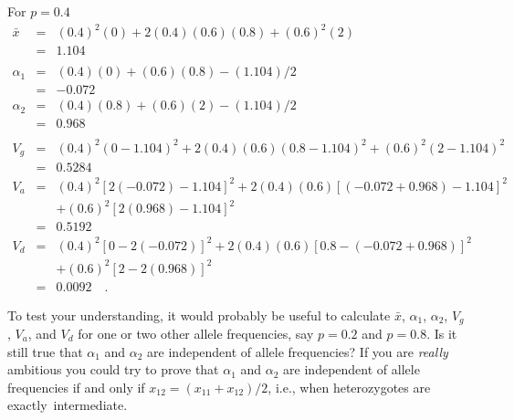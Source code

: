 For $p = 0.4$
\begin{eqnarray*}
{\bar x} &=& (0.4)^2(0) + 2(0.4)(0.6)(0.8) + (0.6)^2(2) \\
                    &=& 1.104 \\
\\
\alpha_1 &=& (0.4)(0) + (0.6)(0.8) - (1.104)/2 \\
         &=& -0.072 \\
\alpha_2 &=& (0.4)(0.8) + (0.6)(2) - (1.104)/2 \\
         &=& 0.968 \\
\\
V_g &=& (0.4)^2(0-1.104)^2 + 2(0.4)(0.6)(0.8-1.104)^2 + (0.6)^2(2-1.104)^2 \\
    &=& 0.5284 \\
V_a &=& (0.4)^2[2(-0.072)-1.104]^2 + 2(0.4)(0.6)[(-0.072+0.968)-1.104]^2 \\
       &&+ (0.6)^2[2(0.968)-1.104]^2 \\
    &=& 0.5192 \\
V_d &=& (0.4)^2[0 - 2(-0.072)]^2 + 2(0.4)(0.6)[0.8 - (-0.072+0.968)]^2 \\
       &&+ (0.6)^2[2 - 2(0.968)]^2 \\
    &=& 0.0092 \quad . 
\end{eqnarray*}

To test your understanding, it would probably be useful to calculate
${\bar x}$, $\alpha_1$, $\alpha_2$, $V_g$, $V_a$, and $V_d$ for one or
two other allele frequencies, say $p=0.2$ and $p=0.8$.  Is it still
true that $\alpha_1$ and $\alpha_2$ are independent of allele
frequencies?  If you are {\it really\/} ambitious you could try to
prove that $\alpha_1$ and $\alpha_2$ are independent of allele
frequencies if and only if $x_{12} = (x_{11}+x_{12})/2$, i.e., when
heterozygotes are exactly~intermediate.

